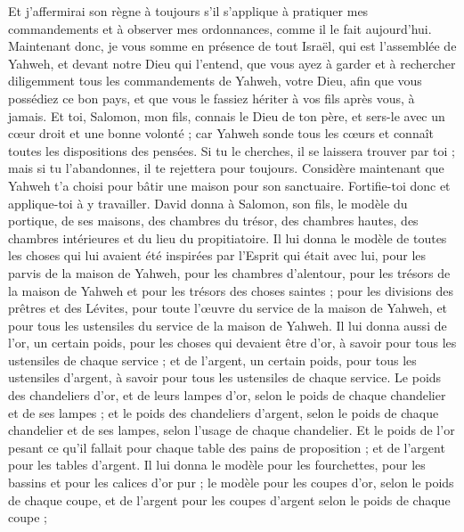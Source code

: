 \begin{multicols}{2}
Et j'affermirai son règne à toujours s'il s'applique à pratiquer mes commandements et à observer mes ordonnances, comme il le fait aujourd'hui.
Maintenant donc, je vous somme en présence de tout Israël, qui est l'assemblée de Yahweh, et devant notre Dieu qui l'entend, que vous ayez à garder et à rechercher diligemment tous les commandements de Yahweh, votre Dieu, afin que vous possédiez ce bon pays, et que vous le fassiez hériter à vos fils après vous, à jamais.
Et toi, Salomon, mon fils, connais le Dieu de ton père, et sers-le avec un cœur droit et une bonne volonté ; car Yahweh sonde tous les cœurs et connaît toutes les dispositions des pensées. Si tu le cherches, il se laissera trouver par toi ; mais si tu l'abandonnes, il te rejettera pour toujours.
Considère maintenant que Yahweh t'a choisi pour bâtir une maison pour son sanctuaire. Fortifie-toi donc et applique-toi à y travailler.
David donna à Salomon, son fils, le modèle du portique, de ses maisons, des chambres du trésor, des chambres hautes, des chambres intérieures et du lieu du propitiatoire.
Il lui donna le modèle de toutes les choses qui lui avaient été inspirées par l'Esprit qui était avec lui, pour les parvis de la maison de Yahweh, pour les chambres d'alentour, pour les trésors de la maison de Yahweh et pour les trésors des choses saintes ;
pour les divisions des prêtres et des Lévites, pour toute l'œuvre du service de la maison de Yahweh, et pour tous les ustensiles du service de la maison de Yahweh.
Il lui donna aussi de l'or, un certain poids, pour les choses qui devaient être d'or, à savoir pour tous les ustensiles de chaque service ; et de l'argent, un certain poids, pour tous les ustensiles d'argent, à savoir pour tous les ustensiles de chaque service.
Le poids des chandeliers d'or, et de leurs lampes d'or, selon le poids de chaque chandelier et de ses lampes ; et le poids des chandeliers d'argent, selon le poids de chaque chandelier et de ses lampes, selon l'usage de chaque chandelier.
Et le poids de l'or pesant ce qu'il fallait pour chaque table des pains de proposition ; et de l'argent pour les tables d'argent.
Il lui donna le modèle pour les fourchettes, pour les bassins et pour les calices d'or pur ; le modèle pour les coupes d'or, selon le poids de chaque coupe, et de l'argent pour les coupes d'argent selon le poids de chaque coupe ;

\end{multicols}
